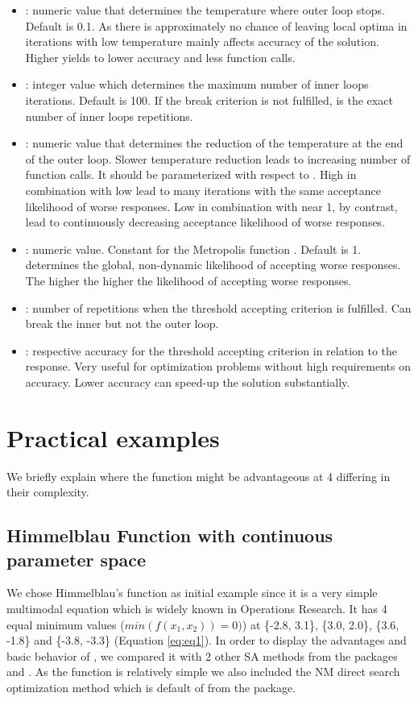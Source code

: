 \begin{itemize}
	\item {}: numeric value that determines the temperature where outer loop stops. Default is 0.1. As there is approximately no chance of leaving local optima in iterations with low temperature  mainly affects accuracy of the solution. Higher  yields to lower accuracy and less function calls.
	\item {}: integer value which determines the maximum number of inner loops iterations. Default is 100. If the break criterion  is not fulfilled,  is the exact number of inner loops repetitions.
	\item {}: numeric value that determines the reduction of the temperature at the end of the outer loop. Slower temperature reduction leads to increasing number of function calls. It should be parameterized with respect to . High  in combination with low  lead to many iterations with the same acceptance likelihood of worse responses. Low  in combination with  near 1, by contrast, lead to continuously decreasing acceptance likelihood of worse responses.
	\item {}: numeric value. Constant for the Metropolis function \citep{kirkpatrick_1983}. Default is 1.  determines the global, non-dynamic likelihood of accepting worse responses. The higher  the higher the likelihood of accepting worse responses.
	\item {}: number of repetitions when the threshold accepting criterion is fulfilled. Can break the inner but not the outer loop.
	\item {}: respective accuracy for the threshold accepting criterion in relation to the response. Very useful for optimization problems without high requirements on accuracy. Lower accuracy can speed-up the solution substantially.
\end{itemize}

\section{Practical examples}
We briefly explain where the  function might be advantageous at 4 differing in their complexity.

\subsection{Himmelblau Function with continuous parameter space}
We chose Himmelblau's function \citep{himmelblau_1972} as initial example since it is a very simple multimodal equation which is widely known in Operations Research. It has 4 equal minimum values ($min(f(x_1,x_2))=0)$) at \{-2.8, 3.1\}, \{3.0, 2.0\}, \{3.6, -1.8\} and \{-3.8, -3.3\} (Equation \ref{eq:eq1}). In order to display the advantages and basic behavior of , we compared it with 2 other SA methods from the packages  and . As the function is relatively simple we also included the NM direct search optimization method \citep{nelder_1965} which is default of  from the  package.

